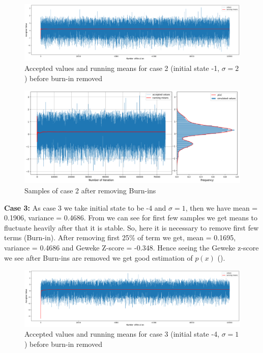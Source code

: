 \begin{example}
	\begin{figure}[H]
		\centering
		\includegraphics[width=1\textwidth]{./images/metropolis/example1/sample-2-values.png}
		\caption{Accepted values and running means for case 2 (initial state -1, $ \sigma = 2 $) before burn-in removed}
	\end{figure}

	\begin{figure}[H]
		\centering
		\includegraphics[width=1\textwidth]{./images/metropolis/example1/sample-2-value-hist-bo.png}
		\caption{Samples of case 2 after removing Burn-ins}
	\end{figure}

	\textbf{Case 3:} As case 3 we take initial state to be -4 and $ \sigma = 1$, then we have mean = 0.1906, variance = 0.4686. From  we can see for first few samples we get means to fluctuate heavily after that it is stable. So, here it is necessary to remove first few terms (Burn-in). After removing first 25\% of term we get, mean = 0.1695, variance = 0.4686 and Geweke Z-score = -0.348. Hence seeing the Geweke z-score we see after Burn-ins are removed we get good estimation of $ p(x) $ ().

	\begin{figure}[H]
		\centering
		\includegraphics[width=1\textwidth]{./images/metropolis/example1/sample-3-values.png}
		\caption{Accepted values and running means for case 3 (initial state -4, $ \sigma = 1 $) before burn-in removed}
		\label{fig:MH sample3}
	\end{figure}


\end{example}
